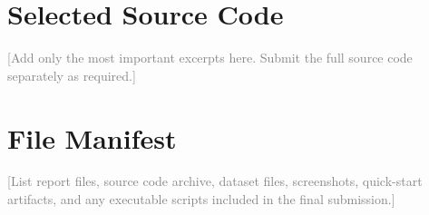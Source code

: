 \documentclass[12pt]{report}
\newcommand{\placeholder}[1]{\textcolor{gray}{[#1]}}
\begin{document}
\chapter{Selected Source Code}
\placeholder{Add only the most important excerpts here. Submit the full source code separately as required.}

\chapter{File Manifest}
\placeholder{List report files, source code archive, dataset files, screenshots, quick-start artifacts, and any executable scripts included in the final submission.}

\newpage
\nocite{*}
\printbibliography
\end{document}
